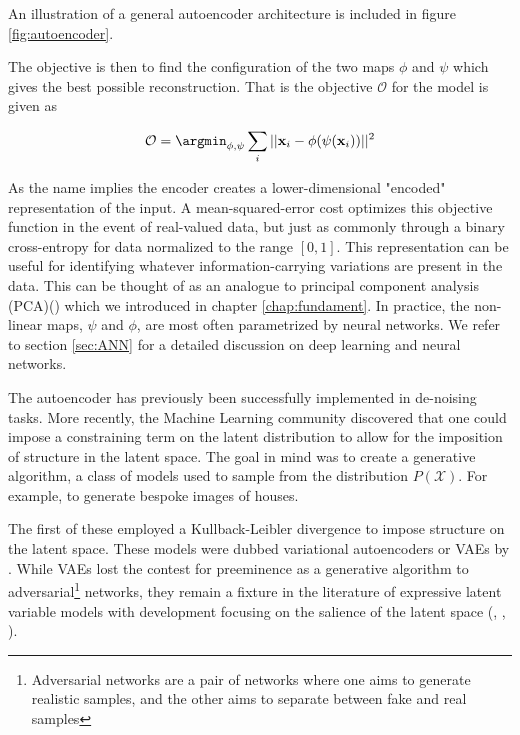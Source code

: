 \noindent An illustration of a general autoencoder architecture is included in figure \ref{fig:autoencoder}.

The objective is then to find the configuration of the two maps $\phi$ and $\psi$ which gives the best possible reconstruction. That is the objective $\mathcal{O}$ for the model is given as

\begin{align}\label{eq:objective_autoenc}
  \mathcal{O} = \argmin_{\phi, \psi} \sum_i || \mathbf{x}_i - \phi(\psi( \mathbf{x}_i ))  ||^2
\end{align}

\noindent  As the name implies the encoder creates a lower-dimensional "encoded" representation of the input. A mean-squared-error cost optimizes this objective function in the event of real-valued data, but just as commonly through a binary cross-entropy for data normalized to the range $[0, 1]$. This representation can be useful for identifying whatever information-carrying variations are present in the data. This can be thought of as an analogue to principal component analysis (PCA)(\cite{Marsland2009}) which we introduced in chapter \ref{chap:fundament}. In practice, the non-linear maps, $\psi$ and $\phi$, are most often parametrized by neural networks. We refer to section \ref{sec:ANN} for a detailed discussion on deep learning and neural networks.

The autoencoder has previously been successfully implemented in de-noising tasks. More recently, the Machine Learning community discovered that one could impose a constraining term on the latent distribution to allow for the imposition of structure in the latent space. The goal in mind was to create a generative algorithm, a class of models used to sample from the distribution $P(\mathcal{X})$. For example, to generate bespoke images of houses. 

The first of these employed a Kullback-Leibler divergence to impose structure on the latent space. These models were dubbed variational autoencoders or VAEs by \citet{Kingma2013}. While VAEs lost the contest for preeminence as a generative algorithm to adversarial\footnote{Adversarial networks are a pair of networks where one aims to generate realistic samples, and the other aims to separate between fake and real samples} networks, they remain a fixture in the literature of expressive latent variable models with development focusing on the salience of the latent space (\cite{Higgins2017}, \cite{Zhao}, \cite{Fertig}).

